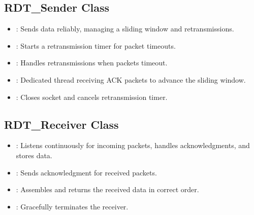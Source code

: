 \documentclass[letterpaper,10pt,english]{sphinxmanual}
\begin{document}
\subsection{RDT\_Sender Class}
\label{\detokenize{documentation:rdt-sender-class}}\begin{itemize}
\item {} 
\sphinxAtStartPar
{}: Sends data reliably, managing a sliding window and retransmissions.

\item {} 
\sphinxAtStartPar
{}: Starts a retransmission timer for packet timeouts.

\item {} 
\sphinxAtStartPar
{}: Handles retransmissions when packets timeout.

\item {} 
\sphinxAtStartPar
{}: Dedicated thread receiving ACK packets to advance the sliding window.

\item {} 
\sphinxAtStartPar
{}: Closes socket and cancels retransmission timer.

\end{itemize}


\subsection{RDT\_Receiver Class}
\label{\detokenize{documentation:rdt-receiver-class}}\begin{itemize}
\item {} 
\sphinxAtStartPar
{}: Listens continuously for incoming packets, handles acknowledgments, and stores data.

\item {} 
\sphinxAtStartPar
{}: Sends acknowledgment for received packets.

\item {} 
\sphinxAtStartPar
{}: Assembles and returns the received data in correct order.

\item {} 
\sphinxAtStartPar
{}: Gracefully terminates the receiver.

\end{itemize}
\end{document}
